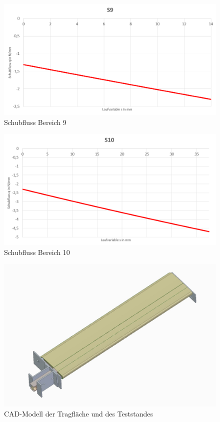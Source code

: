 \begin{figure}[h]
	\includegraphics[width=1.0\textwidth]{Bilder/S9.png}
	\caption{Schubfluss Bereich 9}
\end{figure}
\begin{figure}[h]
	\includegraphics[width=1.0\textwidth]{Bilder/S10.png}
	\caption{Schubfluss Bereich 10}
	\label{fig:S10}
\end{figure}
\newpage

 \label{Profilkontur}



\begin{figure}[h]
	\includegraphics[width=1.0\textwidth]{Bilder/AufbauGesamt.jpg}
	\caption{CAD-Modell der Tragfläche und des Teststandes}
	\label{fig:AufbauGesamt}
\end{figure}


